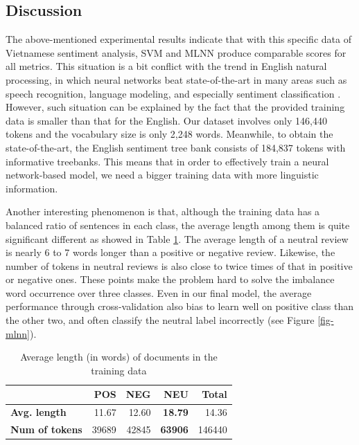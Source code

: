 \documentclass[conference,compsoc]{IEEEtran}
\begin{document}
\subsection{Discussion}
The above-mentioned experimental results indicate that with this specific data of Vietnamese sentiment analysis, SVM and MLNN produce comparable scores for all metrics. This situation is a bit conflict with the trend in English natural processing, in which neural networks beat state-of-the-art in many areas such as speech recognition\cite{NIPS2010_0160}, language modeling\cite{mikolov2012statistical}, and especially sentiment classification \cite{SocherEtAl2011:RAE}. 
However, such situation can be explained by the fact that the provided training data is smaller than that for the English. Our dataset involves only 146,440 tokens and the vocabulary size is only 2,248 words. Meanwhile, to obtain the state-of-the-art, the English sentiment tree bank consists of 184,837 tokens with informative treebanks. This means that in order to effectively train a neural network-based model, we need a bigger training data with more linguistic information.


Another interesting phenomenon is that, although the training data has a balanced ratio of sentences in each class, the average length among them is quite significant different as showed in Table \ref{tb-len}. The average length of a neutral review is nearly 6 to 7 words longer than a positive or negative review. Likewise, the number of tokens in neutral reviews is also close to twice times of that in positive or negative ones. These points make the problem hard to solve the imbalance word occurrence over three classes. Even in our final model, the average performance through cross-validation also bias to learn well on positive class than the other two, and often classify the neutral label incorrectly (see Figure \ref{fig-mlnn}).

\begin{table}[t]
\centering
\caption{Average length (in words) of documents in the training data}
\label{tb-len}
\begin{tabular}{l|r|r|r|r}
                       & \textbf{POS} & \textbf{NEG} & \textbf{NEU}   & \textbf{Total} \\ \hline
\textbf{Avg. length}   & 11.67        & 12.60        & \textbf{18.79} & 14.36          \\ \hline
\textbf{Num of tokens} & 39689        & 42845        & \textbf{63906} & 146440        
\end{tabular}
\end{table}
\end{document}
